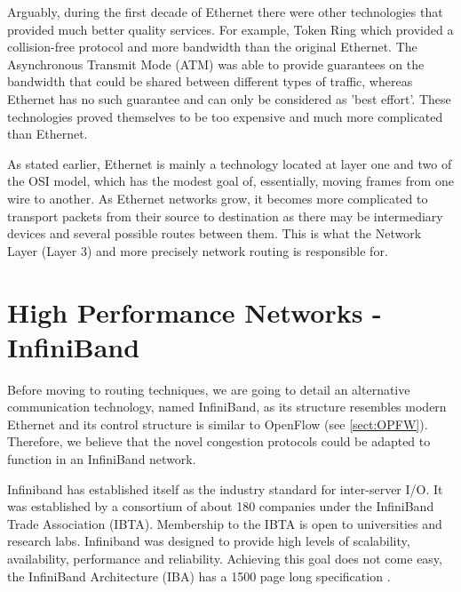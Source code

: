 Arguably, during the first decade of Ethernet there were other technologies that provided much better quality services. For example, Token Ring \cite{IEEE802.5} which provided a collision-free protocol and more bandwidth than the original Ethernet. The Asynchronous Transmit Mode (ATM) was able to provide guarantees on the bandwidth that could be shared between different types of traffic, whereas Ethernet has no such guarantee and can only be considered as 'best effort'. These technologies proved themselves to be too expensive and much more complicated than Ethernet.

As stated earlier, Ethernet is mainly a technology located at layer one and two of the OSI model, which has the modest goal of, essentially, moving frames from one wire to another. As Ethernet networks grow, it becomes more complicated to transport packets from their source to destination as there may be intermediary devices and several possible routes between them. This is what the Network Layer (Layer 3) and more precisely network routing is responsible for. 

\section{High Performance Networks - InfiniBand}

Before moving to routing techniques, we are going to detail an alternative communication technology, named InfiniBand, as its structure resembles modern Ethernet and its control structure is similar to OpenFlow (see \ref{sect:OPFW}). Therefore, we believe that the novel congestion protocols could be adapted to function in an InfiniBand network.

	
Infiniband has established itself as the industry standard for inter-server I/O. It was established by a consortium of about 180 companies under the InfiniBand Trade Association (IBTA). Membership to the IBTA is open to universities and research labs. Infiniband was designed to provide high levels of scalability, availability, performance and reliability. Achieving this goal does not come easy, the InfiniBand Architecture (IBA) has a 1500 page long specification \cite{InfiniBand}.



